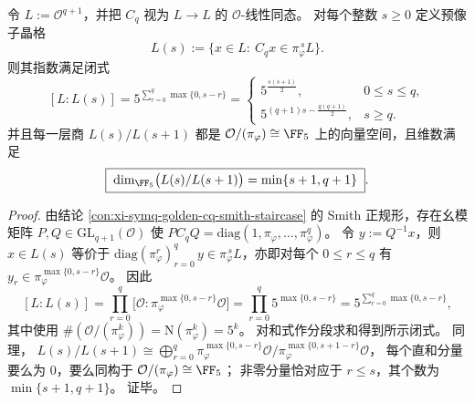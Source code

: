 \begin{conclusion}\label{con:xi-symq-golden-cq-preimage-tower-index}
令 \(L:=\mathcal O^{q+1}\)，并把 \(C_q\) 视为 \(L\to L\) 的 \(\mathcal O\)-线性同态。
对每个整数 \(s\ge 0\) 定义预像子晶格
\[
L(s):=\{x\in L:\ C_qx\in \pi_\varphi^{\,s}L\}.
\]
则其指数满足闭式
\[
\boxed{\;
[L:L(s)]
=5^{\sum_{r=0}^{q}\max\{0,s-r\}}
=
\begin{cases}
5^{\frac{s(s+1)}{2}},& 0\le s\le q,\\[4pt]
5^{(q+1)s-\frac{q(q+1)}{2}},& s\ge q.
\end{cases}\;}
\]
并且每一层商 \(L(s)/L(s+1)\) 都是 \(\mathcal O/(\pi_\varphi)\cong\FF_5\) 上的向量空间，且维数满足
\[
\boxed{\;
\dim_{\FF_5}\bigl(L(s)/L(s+1)\bigr)=\min\{s+1,q+1\}\; } .
\]
\end{conclusion}
\begin{proof}
由结论 \ref{con:xi-symq-golden-cq-smith-staircase} 的 Smith 正规形，存在幺模矩阵 \(P,Q\in\mathrm{GL}_{q+1}(\mathcal O)\) 使
\(
PC_qQ=\mathrm{diag}(1,\pi_\varphi,\dots,\pi_\varphi^q)
 \)。
令 \(y:=Q^{-1}x\)，则 \(x\in L(s)\) 等价于 \(\mathrm{diag}(\pi_\varphi^r)_{r=0}^q\,y\in \pi_\varphi^{\,s}L\)，亦即对每个 \(0\le r\le q\) 有
\(
y_r\in \pi_\varphi^{\max\{0,s-r\}}\mathcal O
\)。
因此
\[
[L:L(s)]
=\prod_{r=0}^{q}\bigl[\mathcal O:\pi_\varphi^{\max\{0,s-r\}}\mathcal O\bigr]
=\prod_{r=0}^{q}5^{\max\{0,s-r\}}
=5^{\sum_{r=0}^q\max\{0,s-r\}},
\]
其中使用 \(\#(\mathcal O/(\pi_\varphi^k))=\mathrm N(\pi_\varphi^k)=5^k\)。
对和式作分段求和得到所示闭式。
同理，
\(
L(s)/L(s+1)\cong\bigoplus_{r=0}^{q}\pi_\varphi^{\max\{0,s-r\}}\mathcal O\big/\pi_\varphi^{\max\{0,s+1-r\}}\mathcal O
\)，
每个直和分量要么为 \(0\)，要么同构于 \(\mathcal O/(\pi_\varphi)\cong\FF_5\)；
非零分量恰对应于 \(r\le s\)，其个数为 \(\min\{s+1,q+1\}\)。
证毕。
\end{proof}

